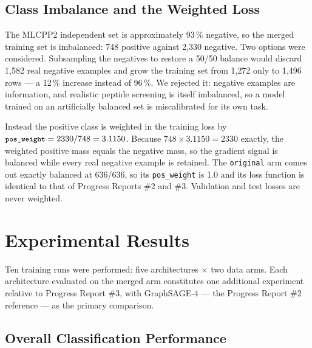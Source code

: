 \documentclass[11pt,a4paper]{article}
\newcommand{\code}[1]{\texttt{\small #1}}
\begin{document}
\subsection{Class Imbalance and the Weighted Loss}
The MLCPP2 independent set is approximately 93\,\% negative, so the merged training set is imbalanced:
748 positive against 2{,}330 negative. Two options were considered. Subsampling the negatives to restore a
50/50 balance would discard 1{,}582 real negative examples and grow the training set from 1{,}272 only to
1{,}496 rows --- a 12\,\% increase instead of 96\,\%. We rejected it: negative examples are information,
and realistic peptide screening is itself imbalanced, so a model trained on an artificially balanced set
is miscalibrated for its own task.

Instead the positive class is weighted in the training loss by
$\code{pos\_weight} = 2330/748 = 3.1150$. Because $748 \times 3.1150 = 2330$ exactly, the weighted
positive mass equals the negative mass, so the gradient signal is balanced while every real negative
example is retained. The \texttt{original} arm comes out exactly balanced at 636/636, so its
\code{pos\_weight} is 1.0 and its loss function is identical to that of Progress Reports \#2 and \#3.
Validation and test losses are never weighted.

\section{Experimental Results}
Ten training runs were performed: five architectures $\times$ two data arms. Each architecture evaluated
on the merged arm constitutes one additional experiment relative to Progress Report \#3, with
GraphSAGE-4 --- the Progress Report \#2 reference --- as the primary comparison.

\subsection{Overall Classification Performance}
\end{document}

